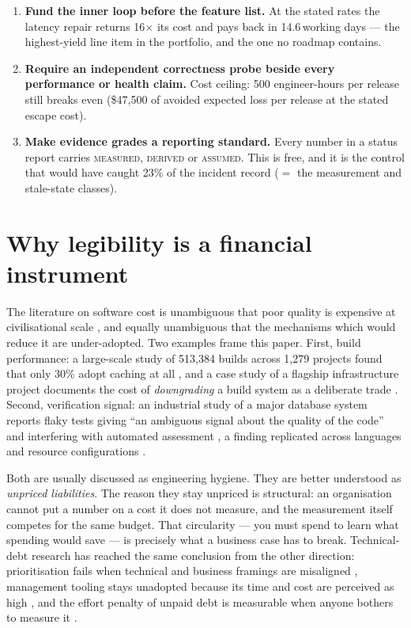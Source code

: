 \documentclass[11pt,a4paper]{article}
\providecommand{\textcite}[1]{\cite{#1}}
\newcommand{\brief}[3]{\begin{tcolorbox}[colback=panelbg,colframe=#1,boxrule=0.8pt,arc=2pt,title=\textbf{#2},coltitle=white,colbacktitle=#1]#3\end{tcolorbox}}
\begin{document}
\brief{sigilgreen}{Three decisions this paper supports}{\begin{enumerate}[leftmargin=1.5em,itemsep=3pt]
\item \textbf{Fund the inner loop before the feature list.} At the stated rates the latency repair returns 16$\times$ its cost and pays back in 14.6\,working days --- the highest-yield line item in the portfolio, and the one no roadmap contains.
\item \textbf{Require an independent correctness probe beside every performance or health claim.} Cost ceiling: 500 engineer-hours per release still breaks even (\$47{,}500 of avoided expected loss per release at the stated escape cost).
\item \textbf{Make evidence grades a reporting standard.} Every number in a status report carries \textsc{measured}, \textsc{derived} or \textsc{assumed}. This is free, and it is the control that would have caught 23\% of the incident record ($=$ the measurement and stale-state classes).
\end{enumerate}}

\section{Why legibility is a financial instrument}
The literature on software cost is unambiguous that poor quality is expensive at civilisational scale \textcite{arxiv2506_13821}, and equally unambiguous that the mechanisms which would reduce it are under-adopted. Two examples frame this paper. First, build performance: a large-scale study of 513{,}384 builds across 1{,}279 projects found that only 30\% adopt caching at all \textcite{arxiv2601_19146}, and a case study of a flagship infrastructure project documents the cost of \emph{downgrading} a build system as a deliberate trade \textcite{arxiv2510_20041}. Second, verification signal: an industrial study of a major database system reports flaky tests giving ``an ambiguous signal about the quality of the code'' and interfering with automated assessment \textcite{arxiv2602_03556}, a finding replicated across languages and resource configurations \textcite{arxiv2208_14799,arxiv2310_12132}.


Both are usually discussed as engineering hygiene. They are better understood as \emph{unpriced liabilities}. The reason they stay unpriced is structural: an organisation cannot put a number on a cost it does not measure, and the measurement itself competes for the same budget. That circularity --- you must spend to learn what spending would save --- is precisely what a business case has to break. Technical-debt research has reached the same conclusion from the other direction: prioritisation fails when technical and business framings are misaligned \textcite{arxiv1908_01347}, management tooling stays unadopted because its time and cost are perceived as high \textcite{arxiv2502_03153}, and the effort penalty of unpaid debt is measurable when anyone bothers to measure it \textcite{arxiv2502_16277}.
\end{document}
